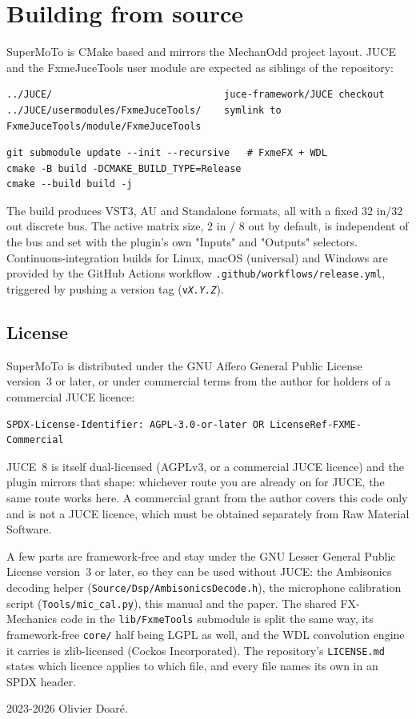 \chapter{Building from source}\label{ch:build}

SuperMoTo is CMake based and mirrors the MechanOdd project layout. JUCE and the FxmeJuceTools user module are expected as siblings of the repository:

\begin{verbatim}
../JUCE/                              juce-framework/JUCE checkout
../JUCE/usermodules/FxmeJuceTools/    symlink to FxmeJuceTools/module/FxmeJuceTools
\end{verbatim}

\begin{verbatim}
git submodule update --init --recursive   # FxmeFX + WDL
cmake -B build -DCMAKE_BUILD_TYPE=Release
cmake --build build -j
\end{verbatim}

The build produces VST3, AU and Standalone formats, all with a fixed 32 in/32 out discrete bus. The active matrix size, 2 in / 8 out by default, is independent of the bus and set with the plugin's own "Inputs" and "Outputs" selectors. Continuous-integration builds for Linux, macOS (universal) and Windows are provided by the GitHub Actions workflow \texttt{.github/workflows/release.yml}, triggered by pushing a version tag (\texttt{v\textit{X.Y.Z}}).

\section{License}
SuperMoTo is distributed under the GNU Affero General Public License version~3
or later, or under commercial terms from the author for holders of a commercial
JUCE licence:
\begin{verbatim}
SPDX-License-Identifier: AGPL-3.0-or-later OR LicenseRef-FXME-Commercial
\end{verbatim}
JUCE~8 is itself dual-licensed (AGPLv3, or a commercial JUCE licence) and the
plugin mirrors that shape: whichever route you are already on for JUCE, the same
route works here. A commercial grant from the author covers this code only and is
not a JUCE licence, which must be obtained separately from Raw Material Software.

A few parts are framework-free and stay under the GNU Lesser General Public
License version~3 or later, so they can be used without JUCE: the Ambisonics
decoding helper (\texttt{Source/Dsp/AmbisonicsDecode.h}), the microphone
calibration script (\texttt{Tools/mic\_cal.py}), this manual and the paper. The
shared FX-Mechanics code in the \texttt{lib/FxmeTools} submodule is split the same
way, its framework-free \texttt{core/} half being LGPL as well, and the WDL
convolution engine it carries is zlib-licensed (Cockos Incorporated). The
repository's \texttt{LICENSE.md} states which licence applies to which file, and
every file names its own in an SPDX header.

\textcopyright{} 2023-2026 Olivier Doaré.
